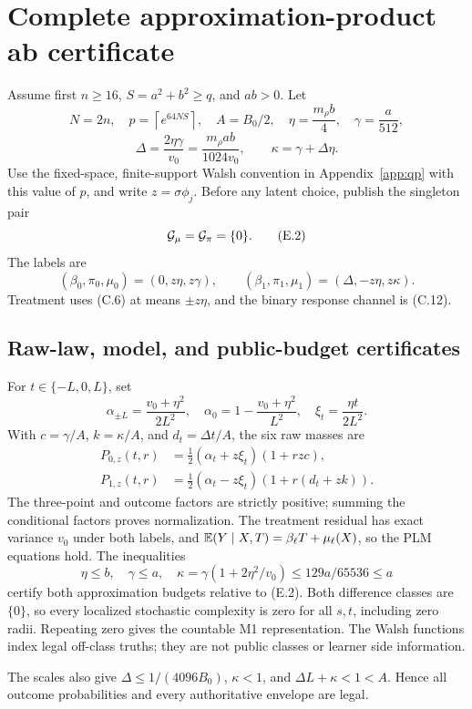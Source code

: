 \section{Complete approximation-product ab certificate}
\label{app:ab}

Assume first \(n\ge16\), \(S=a^2+b^2\ge q\), and \(ab>0\).  Let
\[
 N=2n,\quad p=\left\lceil e^{64NS}\right\rceil,\quad A=B_0/2,\quad
 \eta=\frac{m_\rho b}{4},\quad \gamma=\frac a{512},
\]
\[
 \Delta=\frac{2\eta\gamma}{v_0}
 =\frac{m_\rho ab}{1024v_0},\qquad
 \kappa=\gamma+\Delta\eta.
 \tag{E.1}
\]
Use the fixed-space, finite-support Walsh convention in Appendix~\ref{app:qp}
with this value of \(p\), and write \(z=\sigma\phi_j\).  Before any latent choice, publish the
singleton pair
\[
 \mathcal G_\mu=\mathcal G_\pi=\{0\}.
 \tag{E.2}
\]
The labels are
\[
 (\beta_0,\pi_0,\mu_0)=(0,z\eta,z\gamma),\qquad
 (\beta_1,\pi_1,\mu_1)=(\Delta,-z\eta,z\kappa).
 \tag{E.3}
\]
Treatment uses (C.6) at means \(\pm z\eta\), and the binary response channel
is (C.12).

\subsection{Raw-law, model, and public-budget certificates}

For \(t\in\{-L,0,L\}\), set
\[
 \alpha_{\pm L}=\frac{v_0+\eta^2}{2L^2},\quad
 \alpha_0=1-\frac{v_0+\eta^2}{L^2},\quad
 \xi_t=\frac{\eta t}{2L^2}.
\]
With \(c=\gamma/A\), \(k=\kappa/A\), and \(d_t=\Delta t/A\), the six raw
masses are
\begin{align}
 P_{0,z}(t,r)&=\tfrac12(\alpha_t+z\xi_t)(1+rzc),\nonumber\\
 P_{1,z}(t,r)&=\tfrac12(\alpha_t-z\xi_t)(1+r(d_t+zk)).
 \tag{E.4}
\end{align}
The three-point and outcome factors are strictly positive; summing the
conditional factors proves normalization.  The treatment residual has exact
variance \(v_0\) under both labels, and
\(\mathbb E(Y\mid X,T)=\beta_\ell T+\mu_\ell(X)\), so the PLM equations hold.
The inequalities
\[
 \eta\le b,\quad \gamma\le a,\quad
 \kappa=\gamma(1+2\eta^2/v_0)\le129a/65536\le a
 \tag{E.5}
\]
certify both approximation budgets relative to (E.2).  Both difference
classes are \(\{0\}\), so every localized stochastic complexity is zero for
all \(s,t\), including zero radii.  Repeating zero gives the countable M1
representation.  The Walsh functions index legal off-class truths; they
are not public classes or learner side information.

The scales also give
\(\Delta\le1/(4096B_0)\),
\(\kappa<1\), and \(\Delta L+\kappa<1<A\).  Hence all outcome
probabilities and every authoritative envelope are legal.

